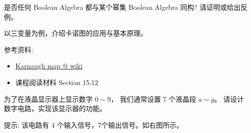 \documentclass[a4paper, justified]{tufte-handout}
\begin{document}
\beginoptional

\begin{problem}[Isomorphic]
是否任何 Boolean Algebra 都与某个幂集 Boolean Algebra 同构?
请证明或给出反例。
\end{problem}

\begin{solution}
\end{solution}

\beginot

\begin{ot}
  以三变量为例，介绍卡诺图的应用与基本原理。

  参考资料:
  \begin{itemize}
    \item \href{https://en.wikipedia.org/wiki/Karnaugh\_map}{Karnaugh map @ wiki}
    \item 课程阅读材料 Section 15.12
  \end{itemize}
\end{ot}

\vspace{0.50cm}
\begin{ot}
  为了在液晶显示器上显示数字 $0 \sim 9$，
  我们通常设置 7 个液晶段 $a \sim g$。
  请设计数字电路，实现该显示器的功能。

  提示: 该电路有 4 个输入信号，7个输出信号。如右图所示。
\end{ot}




\beginfb

\end{document}

